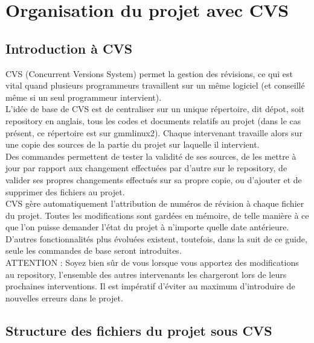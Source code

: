 \documentclass[12pt,a4paper]{../doc}
\begin{document}
{\section{Organisation du projet avec CVS}

\subsection{Introduction \`a CVS}
  CVS (Concurrent Versions System) permet la gestion des r\'evisions, ce qui est vital quand plusieurs programmeurs travaillent sur un m\^eme logiciel (et conseill\'e m\^eme si un seul programmeur intervient).\\[0.4cm]
L'id\'ee de base de CVS est de centraliser sur un unique r\'epertoire, dit d\'epot, soit repository en anglais, tous les codes et documents relatifs au projet (dans le cas pr\'esent, ce r\'epertoire est sur gmmlinux2). Chaque intervenant travaille alors sur une copie des sources de la partie du projet sur laquelle il intervient.\\[0.4cm]
Des commandes permettent de tester la validit\'e de ses sources, de les mettre \`a jour par rapport aux changement effectu\'ees par d'autre sur le repository, de valider ses propres changements effectu\'es sur sa propre copie, ou d'ajouter et de supprimer des fichiers au projet.\\[0.4cm]
CVS g\`ere automatiquement l'attribution de num\'eros de r\'evision \`a chaque fichier du projet. Toutes les modifications sont gard\'ees en m\'emoire, de telle mani\`ere \`a ce que l'on puisse demander l'\'etat du projet \`a n'importe quelle date ant\'erieure. \\[0.4cm]
D'autres fonctionnalit\'es plus \'evolu\'ees existent, toutefois, dans la suit de ce guide, seule les commandes de base seront introduites.\\[0.4cm]
ATTENTION : Soyez bien s\^ur de vous lorsque vous apportez des modifications au repository, l'ensemble des autres intervenants les chargeront lors de leurs prochaines interventions. Il est imp\'eratif d'\'eviter au maximum d'introduire de nouvelles erreurs dans le projet. 

  
\subsection{Structure des fichiers du projet sous CVS}

}
\end{document}
